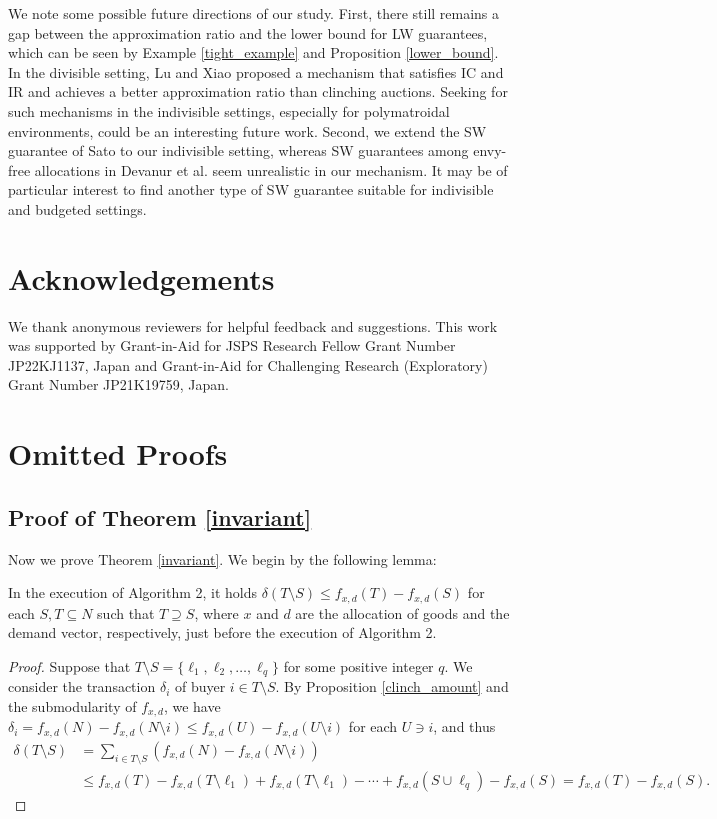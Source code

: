 \documentclass[letterpaper,11pt]{article}
\begin{document}
	We note some possible future directions of our study.
	First, there still remains a gap between the approximation ratio and the lower bound for LW guarantees, 
	which can be seen by Example \ref{tight_example} and Proposition \ref{lower_bound}.
	In the divisible setting, Lu and Xiao \cite{LX2015} proposed a mechanism 
	that satisfies IC and IR and achieves a better approximation ratio than clinching auctions. 
	Seeking for such mechanisms in the indivisible settings, 
	especially for polymatroidal environments, could be an interesting future work.
	Second, we extend the SW guarantee of Sato \cite{S2023} to our indivisible setting,
	whereas SW guarantees among envy-free allocations in Devanur et al. \cite{DHH2013} seem unrealistic in our mechanism.
	It may be of particular interest to find another type of SW guarantee suitable for indivisible and budgeted settings.

	\section*{Acknowledgements}
	We thank anonymous reviewers for helpful feedback and suggestions.
	This work was supported by Grant-in-Aid for JSPS Research Fellow Grant Number JP22KJ1137, Japan 
	and Grant-in-Aid for Challenging Research (Exploratory) Grant Number JP21K19759, Japan.

	
	
	\appendix

\section{Omitted Proofs}
\subsection{Proof of Theorem \ref{invariant}}
	Now we prove Theorem \ref{invariant}. We begin by the following lemma:
	\begin{lemma}
	\label{prepare_inv}
	In the execution of Algorithm 2, it holds
	$\displaystyle \delta(T\setminus S) \leq f_{x,d}(T)-f_{x,d}(S)$ 
	for each $S,T\subseteq N$ such that $T\supseteq S$, 
	where $x$ and $d$ are the allocation of goods and the demand vector, respectively, just before the execution of Algorithm 2.
	\end{lemma}
	\begin{proof}
	Suppose that $T\setminus S=\{\ell_1,\ell_2,\ldots, \ell_q\}$ for some positive integer $q$.
	We consider the transaction $\delta_i$ of buyer $i\in T\setminus S$.
	By Proposition \ref{clinch_amount} and the submodularity of $f_{x,d}$, 
	we have $\delta_i = f_{x,d}(N)-f_{x,d}(N\setminus i)\leq  f_{x,d}(U)-f_{x,d}(U\setminus i)$ 
	for each $U\ni i$, and thus 
	\begin{align*}
	\delta(T\setminus S) &=\sum_{i\in T\setminus S}(f_{x,d}(N)-f_{x,d}(N\setminus i)) \\
	&\leq f_{x,d}(T)-f_{x,d}(T\setminus \ell_1)+f_{x,d}(T\setminus \ell_1)-
	\cdots +f_{x,d}(S\cup \ell_q)-f_{x,d}(S)=f_{x,d}(T)-f_{x,d}(S).
	\end{align*}
	\end{proof}
	
\end{document}
